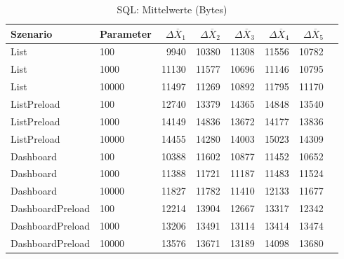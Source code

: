 
\begin{table}[ht]
\setlength{\extrarowheight}{-1pt}
\centering
\caption{SQL: Mittelwerte (Bytes)}
\begin{tabular}{llrrrrrr}
\toprule
Szenario & Parameter & ${\Delta \overline{X}_1}$ & ${\Delta \overline{X}_2}$ & ${\Delta \overline{X}_3}$ & ${\Delta \overline{X}_4}$ & ${\Delta \overline{X}_5}$ \\
\midrule
	List & 100 & 9940 & 10380 & 11308 & 11556 & 10782 \\
	List & 1000 & 11130 & 11577 & 10696 & 11146 & 10795 \\
	List & 10000 & 11497 & 11269 & 10892 & 11795 & 11170 \\
	ListPreload & 100 & 12740 & 13379 & 14365 & 14848 & 13540 \\
	ListPreload & 1000 & 14149 & 14836 & 13672 & 14177 & 13836 \\
	ListPreload & 10000 & 14455 & 14280 & 14003 & 15023 & 14309 \\
	Dashboard & 100 & 10388 & 11602 & 10877 & 11452 & 10652 \\
	Dashboard & 1000 & 11388 & 11721 & 11187 & 11483 & 11524 \\
	Dashboard & 10000 & 11827 & 11782 & 11410 & 12133 & 11677 \\
	DashboardPreload & 100 & 12214 & 13904 & 12667 & 13317 & 12342 \\
	DashboardPreload & 1000 & 13206 & 13491 & 13114 & 13414 & 13474 \\
	DashboardPreload & 10000 & 13576 & 13671 & 13189 & 14098 & 13680 \\
\bottomrule
\end{tabular}
\label{tab:mittelwerte_sql_bytes}
\end{table}
	